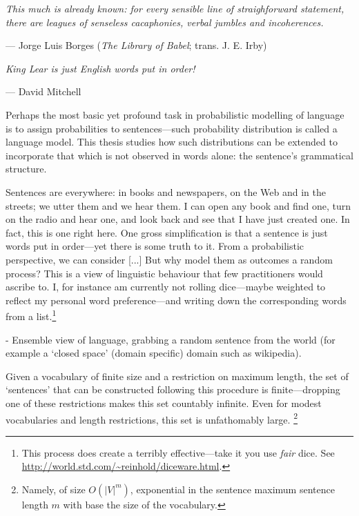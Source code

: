 \setlength{\epigraphwidth}{4in}
\epigraph{\textit{This much is already known: for every sensible line of straighforward statement, there are leagues of senseless cacaphonies, verbal jumbles and incoherences.}}{--- Jorge Luis Borges (\textit{The Library of Babel}; trans. J. E. Irby)}

\setlength{\epigraphwidth}{2.5in}
\epigraph{\textit{King Lear is just English words put in order!}}{--- David Mitchell}

Perhaps the most basic yet profound task in probabilistic modelling of language is to assign probabilities to sentences---such probability distribution is called a language model. This thesis studies how such distributions can be extended to incorporate that which is not observed in words alone: the sentence's grammatical structure.

  Sentences are everywhere: in books and newspapers, on the Web and in the streets; we utter them and we hear them. I can open any book and find one, turn on the radio and hear one, and look back and see that I have just created one. In fact, this is one right here. One gross simplification is that a sentence is just words put in order---yet there is some truth to it. From a probabilistic perspective, we can consider [...] But why model them as outcomes a random process? This is a view of linguistic behaviour that few practitioners would ascribe to. I, for instance am currently not rolling dice---maybe weighted to reflect my personal word preference---and writing down the corresponding words from a list.\footnote{This process does create a terribly effective---take it you use \textit{fair} dice. See \url{http://world.std.com/~reinhold/diceware.html}.}

  - Ensemble view of language, grabbing a random sentence from the world (for example a `closed space' (domain specific) domain such as wikipedia).

  Given a vocabulary of finite size and a restriction on maximum length, the set of `sentences' that can be constructed following this procedure is finite---dropping one of these restrictions makes this set countably infinite. Even for modest vocabularies and length restrictions, this set is unfathomably large. \footnote{Namely, of size $O(\lvert V \rvert^m)$, exponential in the sentence maximum sentence length $m$ with base the size of the vocabulary.}

